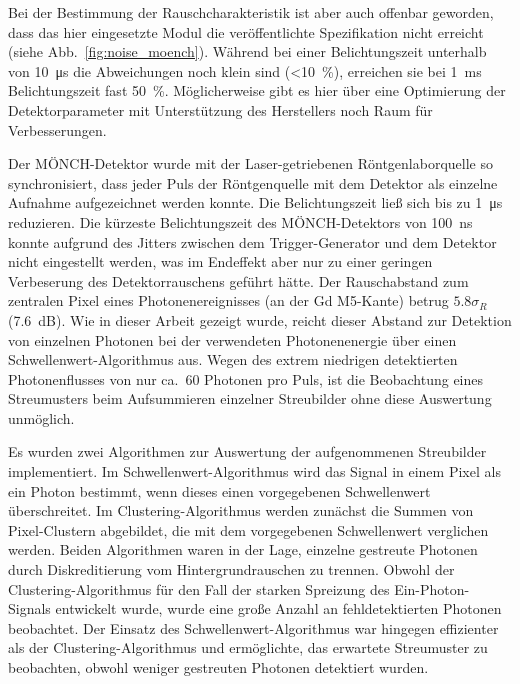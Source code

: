 \noindent
Bei der Bestimmung der Rauschcharakteristik ist aber auch offenbar geworden, dass das hier eingesetzte Modul die veröffentlichte Spezifikation \cite{ramilli-measurements-2017} nicht erreicht (siehe Abb.~\ref{fig:noise_moench}). Während bei einer Belichtungszeit unterhalb von \SI{10}{\micro s} die Abweichungen noch klein sind (\SI{<10}{\percent}), erreichen sie bei \SI{1}{ms} Belichtungszeit fast \SI{50}{\percent}. Möglicherweise gibt es hier über eine Optimierung der Detektorparameter mit Unterstützung des Herstellers noch Raum für Verbesserungen.

\noindent
Der MÖNCH-Detektor wurde mit der Laser-getriebenen Röntgenlaborquelle so synchronisiert, dass jeder Puls der Röntgenquelle mit dem Detektor als einzelne Aufnahme aufgezeichnet werden konnte. Die Belichtungszeit ließ sich bis zu \SI{1}{\micro\second} reduzieren. Die kürzeste Belichtungszeit des MÖNCH-Detektors von \SI{100}{\nano\second} konnte aufgrund des Jitters zwischen dem Trigger-Generator und dem Detektor nicht eingestellt werden, was im Endeffekt aber nur zu einer geringen Verbeserung des Detektorrauschens geführt hätte. Der Rauschabstand zum zentralen Pixel eines Photonenereignisses (an der Gd M5-Kante) betrug $\num{5.8}\sigma_R$ (\SI{7.6}{\dB}). Wie in dieser Arbeit gezeigt wurde, reicht dieser Abstand zur Detektion von einzelnen Photonen bei der verwendeten Photonenenergie über einen Schwellenwert-Algorithmus aus.
Wegen des extrem niedrigen detektierten Photonenflusses von nur ca.\ 60 Photonen pro Puls, ist die Beobachtung eines Streumusters beim Aufsummieren einzelner Streubilder ohne diese Auswertung unmöglich.

\noindent
Es wurden zwei Algorithmen zur Auswertung der aufgenommenen Streubilder implementiert. Im Schwellenwert-Algorithmus wird das Signal in einem Pixel als ein Photon bestimmt, wenn dieses einen vorgegebenen Schwellenwert überschreitet. Im Clustering-Algorithmus werden zunächst die Summen von Pixel-Clustern abgebildet, die mit dem vorgegebenen Schwellenwert verglichen werden. Beiden Algorithmen waren in der Lage, einzelne gestreute Photonen durch Diskreditierung vom Hintergrundrauschen zu trennen. Obwohl der Clustering-Algorithmus für den Fall der starken Spreizung des Ein-Photon-Signals entwickelt wurde, wurde eine große Anzahl an fehldetektierten Photonen beobachtet. Der Einsatz des Schwellenwert-Algorithmus war hingegen effizienter als der Clustering-Algorithmus und ermöglichte, das erwartete Streumuster zu beobachten, obwohl weniger gestreuten Photonen detektiert wurden.  

